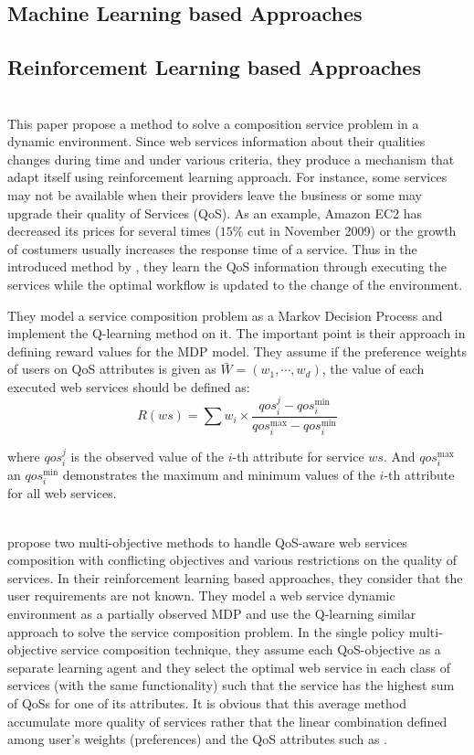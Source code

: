 \documentclass[10pt,journal,compsoc]{IEEEtran}
\begin{document}
\subsection{Machine Learning based Approaches}

\subsection{Reinforcement Learning  based Approaches}
 
  \cite{Wang2010}\\
This paper propose a method to solve a composition service problem in a dynamic environment. Since web services information about their qualities changes during time and 
under various criteria, they produce a mechanism that adapt itself using reinforcement learning approach. For instance, some services may not be available when their providers leave the business or some may upgrade their quality of Services (QoS). As an example, Amazon EC2 has decreased its prices for several times ($15\%$ cut in November 2009) or the growth of costumers usually increases the response time of a service. Thus  in the introduced method by \cite{Wang2010}, they learn the QoS information through executing the services while the optimal workflow is updated to the change of the environment. 

They model a service composition problem as a Markov Decision Process and implement the Q-learning method on it. The important point is their approach in defining reward values for the MDP model. They assume if the preference weights of users on QoS attributes is given as $\bar{W} = (w_1, \cdots, w_d)$, the value of each executed web services should be defined as: 
\begin{equation}
R(ws) = \sum w_i \times \frac{qos_i^j - qos_i^{\text{min}}}{qos_i^{\text{max}}-qos_i^{\text{min}}}
\end{equation}

where $qos_i^j$ is the observed value of the $i$-th attribute for service $ws$. And $qos_i^{\text{max}}$ an $qos_i^{\text{min}}$ demonstrates the maximum and minimum values of the $i$-th attribute for all web services.


 \cite{Mostafa2015}  \\
 \cite{Mostafa2015} propose two multi-objective methods to handle QoS-aware web services composition with conflicting objectives and various restrictions on the quality of services. In their reinforcement learning based approaches, they consider that the user requirements are not known. They model a web service dynamic environment as a partially observed MDP and use the Q-learning similar approach to solve the service composition problem. In the single policy multi-objective service composition technique, they assume each QoS-objective as a separate learning agent and they select the optimal web service in each class of services (with the same functionality) such that the service has the highest sum of QoSs for one of its attributes. It is obvious that this average method accumulate more quality of services rather that the linear combination defined among user's weights (preferences) and the QoS attributes such as \cite{Wang2010}. 
 
\end{document}
